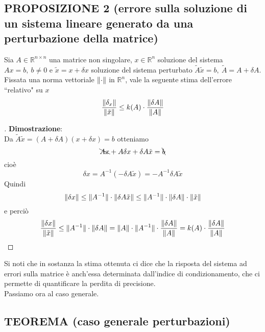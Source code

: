 \documentclass[12pt,a4paper]{article}
\DeclarePairedDelimiter{\norma}{\lVert}{\rVert}
\begin{document}
\subsection{PROPOSIZIONE 2 (errore sulla soluzione di un sistema lineare generato da una perturbazione della matrice)}
Sia $A \in \mathbb{R}^{n \times n}$ una matrice non singolare, $x \in \mathbb{R}^n$ soluzione del sistema $Ax = b, \ b \neq 0$ e $\tilde{x} = x + \delta x$ soluzione del sistema perturbato $\tilde{A} \tilde{x} = b, \ \tilde{A} = A + \delta A$.\\
Fissata una norma vettoriale $\norma{\cdot}$ in $\mathbb{R}^n$, vale la seguente stima dell'errore ``relativo" su $x$
\[
\frac{\norma{\delta_x}}{\norma{\tilde{x}}} \le k(A) \cdot \frac{\norma{\delta A}}{\norma{A}}
\]
\begin{proof}[\unskip\nopunct]
\textbf{Dimostrazione}:\\
Da $\tilde{A} \tilde{x} = (A + \delta A)(x + \delta x) = b$ otteniamo
\[
\bcancel{Ax} + A\delta x + \delta A \tilde{x} = \bcancel{b}
\]
cioè
\[
\delta x = A^{-1} (-\delta A \tilde{x}) = -A^{-1} \delta A\tilde{x}
\]
Quindi
\[
\norma{\delta x} \le \norma{A^{-1}} \cdot \norma{\delta A \tilde{x}} \le \norma{A^{-1}} \cdot \norma{\delta A} \cdot \norma{\tilde{x}}
\]
e perciò
\[
\frac{\norma{\delta x}}{\norma{\tilde{x}}} \le \norma{A^{-1}} \cdot \norma{\delta A} = \norma{A} \cdot \norma{A^{-1}} \cdot \frac{\norma{\delta A}}{\norma{A}} = k(A) \cdot \frac{\norma{\delta A}}{\norma{A}}
\]
\end{proof}
Si noti che in sostanza la stima ottenuta ci dice che la risposta del sistema ad errori sulla matrice è anch'essa determinata dall'indice di condizionamento, che ci permette di quantificare la perdita di precisione.\\
Passiamo ora al caso generale.\\

\subsection{TEOREMA (caso generale perturbazioni)}
\begin{center}
\end{center}
\end{document}
